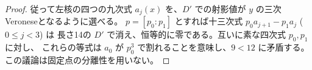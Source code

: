 \begin{proof}
従って左核の四つの九次式 $a_j(x)$ を、$D'$ での射影値が $y$ の三次Veroneseとなるように選べる。
$p=[p_0:p_1]$ とすれば十三次式 $p_0a_{j+1}-p_1a_j$ ($0\le j<3$) は
長さ14の $D'$ で消え、恒等的に零である。互いに素な四次式 $p_0,p_1$ に対し、
これらの等式は $a_0$ が $p_0^3$ で割れることを意味し、$9<12$ に矛盾する。
この議論は固定点の分離性を用いない。
\end{proof}
